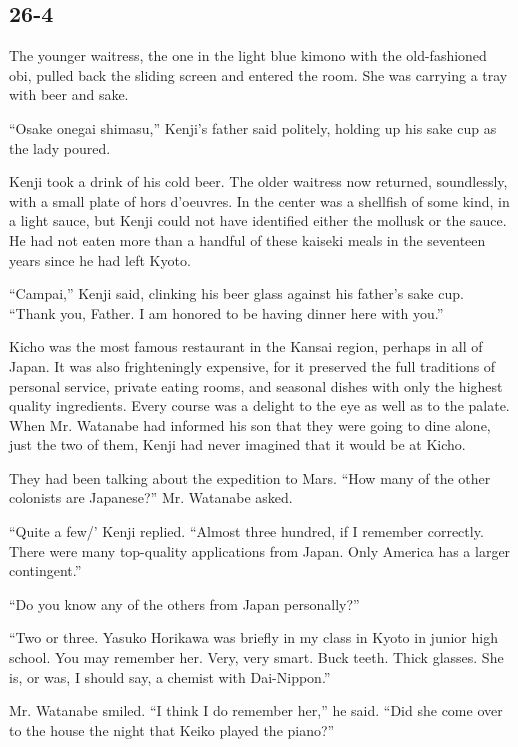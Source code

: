 \documentclass[]{article}
\begin{document}
{\subsection*{26-4}

The younger waitress, the one in the light blue kimono with the old-fashioned obi, pulled back the sliding screen and entered the room.  She was carrying a tray with beer and sake.

“Osake onegai shimasu,” Kenji’s father said politely, holding up his sake cup as the lady poured.

Kenji took a drink of his cold beer.  The older waitress now returned, soundlessly, with a small plate of hors d’oeuvres.  In the center was a shellfish of some kind, in a light sauce, but Kenji could not have identified either the mollusk or the sauce.  He had not eaten more than a handful of these kaiseki meals in the seventeen years since he had left Kyoto.

“Campai,” Kenji said, clinking his beer glass against his father’s sake cup.  “Thank you, Father.  I am honored to be having dinner here with you.”

Kicho was the most famous restaurant in the Kansai region, perhaps in all of Japan.  It was also frighteningly expensive, for it preserved the full traditions of personal service, private eating rooms, and seasonal dishes with only the highest quality ingredients.  Every course was a delight to the eye as well as to the palate.  When Mr.  Watanabe had informed his son that they were going to dine alone, just the two of them, Kenji had never imagined that it would be at Kicho.

They had been talking about the expedition to Mars.  “How many of the other colonists are Japanese?” Mr.  Watanabe asked.

“Quite a few/’ Kenji replied.  “Almost three hundred, if I remember correctly.  There were many top-quality applications from Japan.  Only America has a larger contingent.”

“Do you know any of the others from Japan personally?”

“Two or three.  Yasuko Horikawa was briefly in my class in Kyoto in junior high school.  You may remember her.  Very, very smart.  Buck teeth.  Thick glasses.  She is, or was, I should say, a chemist with Dai-Nippon.”

Mr.  Watanabe smiled.  “I think I do remember her,” he said.  “Did she come over to the house the night that Keiko played the piano?”

}
\end{document}
